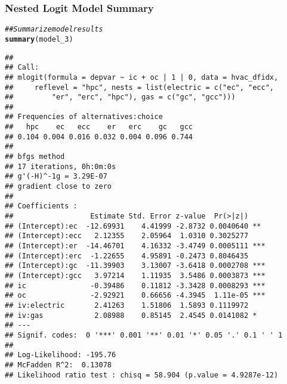 \documentclass{beamer}\usepackage[]{graphicx}\usepackage[]{color}
\makeatletter
\newcommand{\hlcom}[1]{\textcolor[rgb]{0.678,0.584,0.686}{\textit{#1}}}%
\newcommand{\hlstd}[1]{\textcolor[rgb]{0.345,0.345,0.345}{#1}}%
\newcommand{\hlkwd}[1]{\textcolor[rgb]{0.737,0.353,0.396}{\textbf{#1}}}%
\newenvironment{kframe}{%
 \def\at@end@of@kframe{}%
 \ifinner\ifhmode%
  \def\at@end@of@kframe{\end{minipage}}%
  \begin{minipage}{\columnwidth}%
 \fi\fi%
 \def\FrameCommand##1{\hskip\@totalleftmargin \hskip-\fboxsep
 \colorbox{shadecolor}{##1}\hskip-\fboxsep
     \hskip-\linewidth \hskip-\@totalleftmargin \hskip\columnwidth}%
 \MakeFramed {\advance\hsize-\width
   \@totalleftmargin\z@ \linewidth\hsize
   \@setminipage}}%
 {\par\unskip\endMakeFramed%
 \at@end@of@kframe}
\newenvironment{knitrout}{}{} %
\makeatother
\begin{document}
\begin{frame}[fragile]\frametitle{Nested Logit Model Summary}
    \vspace{1ex}
\begin{knitrout}\tiny
{}\color{fgcolor}\begin{kframe}
\begin{alltt}
\hlcom{## Summarize model results}
\hlkwd{summary}\hlstd{(model_3)}
\end{alltt}
\begin{verbatim}
## 
## Call:
## mlogit(formula = depvar ~ ic + oc | 1 | 0, data = hvac_dfidx, 
##     reflevel = "hpc", nests = list(electric = c("ec", "ecc", 
##         "er", "erc", "hpc"), gas = c("gc", "gcc")))
## 
## Frequencies of alternatives:choice
##   hpc    ec   ecc    er   erc    gc   gcc 
## 0.104 0.004 0.016 0.032 0.004 0.096 0.744 
## 
## bfgs method
## 17 iterations, 0h:0m:0s 
## g'(-H)^-1g = 3.29E-07 
## gradient close to zero 
## 
## Coefficients :
##                  Estimate Std. Error z-value  Pr(>|z|)    
## (Intercept):ec  -12.69931    4.41999 -2.8732 0.0040640 ** 
## (Intercept):ecc   2.12355    2.05964  1.0310 0.3025277    
## (Intercept):er  -14.46701    4.16332 -3.4749 0.0005111 ***
## (Intercept):erc  -1.22655    4.95891 -0.2473 0.8046435    
## (Intercept):gc  -11.39903    3.13007 -3.6418 0.0002708 ***
## (Intercept):gcc   3.97214    1.11935  3.5486 0.0003873 ***
## ic               -0.39486    0.11812 -3.3428 0.0008293 ***
## oc               -2.92921    0.66656 -4.3945  1.11e-05 ***
## iv:electric       2.41263    1.51806  1.5893 0.1119972    
## iv:gas            2.08988    0.85145  2.4545 0.0141082 *  
## ---
## Signif. codes:  0 '***' 0.001 '**' 0.01 '*' 0.05 '.' 0.1 ' ' 1
## 
## Log-Likelihood: -195.76
## McFadden R^2:  0.13078 
## Likelihood ratio test : chisq = 58.904 (p.value = 4.9287e-12)
\end{verbatim}
\end{kframe}
\end{knitrout}
\end{frame}
\end{document}
